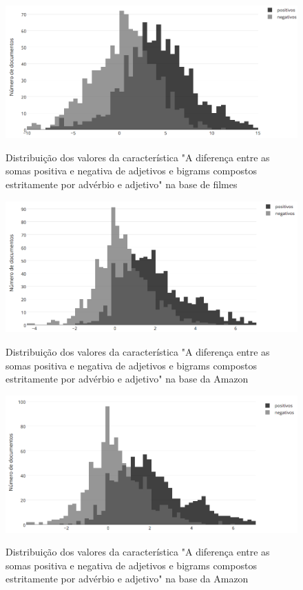 \documentclass[template.tex]{subfiles}
\begin{document}
\begin{figure}[H]
\caption{Distribuição dos valores da característica "A diferença entre as somas positiva e negativa de adjetivos e bigrams compostos estritamente por advérbio e adjetivo" na base de filmes}
\centering
\includegraphics[scale=0.45]{movies_positive_to_negative_ratio_of_unigrams_and_bigrams_sum}
\label{figura:movies_dist_2}
\end{figure}


\begin{figure}[H]
\caption{Distribuição dos valores da característica "A diferença entre as somas positiva e negativa de adjetivos e bigrams compostos estritamente por advérbio e adjetivo" na base da Amazon}
\centering
\includegraphics[scale=0.45]{amazon_positive_to_negative_ratio_of_adjectives_sum_and_bigrams_with_adjectives}
\label{figura:amazon_dist_1}
\end{figure}

\begin{figure}[H]
\caption{Distribuição dos valores da característica "A diferença entre as somas positiva e negativa de adjetivos e bigrams compostos estritamente por advérbio e adjetivo" na base da Amazon}
\centering
\includegraphics[scale=0.45]{amazon_positive_to_negative_ratio_of_unigrams_and_bigrams_sum}
\label{figura:amazon_dist_2}
\end{figure}
\end{document}
